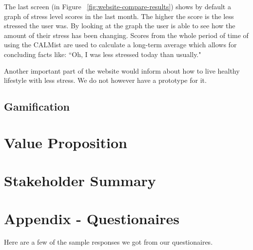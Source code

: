 \documentclass{scrartcl}
\begin{document}
The last screen (in Figure ~\ref{fig:website-compare-results}) shows by default a graph of stress level scores in the last month. The higher the score is the less stressed the user was. By looking at the graph the user is able to see how the amount of their stress has been changing. Scores from the whole period of time of using the CALMist are used to calculate a long-term average which allows for concluding facts like: ``Oh, I was less stressed today than usually."

Another important part of the website would inform about how to live healthy lifestyle with less stress. We do not however have a prototype for it.

\subsection{Gamification}

\section{Value Proposition}

\section{Stakeholder Summary}

\section{Appendix - Questionaires}
Here are a few of the sample responses we got from our questionaires.






\end{document}
